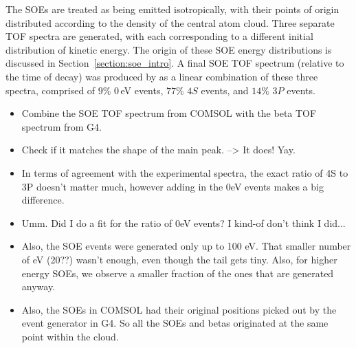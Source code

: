 The SOEs are treated as being emitted isotropically, with their points of origin distributed according to the density of the central atom cloud.  Three separate TOF spectra are generated, with each corresponding to a different initial distribution of kinetic energy.  The origin of these SOE energy distributions is discussed in Section~\ref{section:soe_intro}.  A final SOE TOF spectrum (relative to the time of decay) was produced by as a linear combination of these three spectra, comprised of $9\%$ 0\,eV events, $77\%$ $4S$ events, and $14\%$ $3P$ events.

\begin{itemize}
	\item Combine the SOE TOF spectrum from COMSOL with the beta TOF spectrum from G4.  
	\item Check if it matches the shape of the main peak. --> It does!  Yay.  
	\item In terms of agreement with the experimental spectra, the exact ratio of 4S to 3P doesn't matter much, however adding in the 0eV events makes a big difference.   
	\item Umm.  Did I do a fit for the ratio of 0eV events?  I kind-of don't think I did... 
	\item Also, the SOE events were generated only up to 100 eV.  That smaller number of eV (20??) wasn't enough, even though the tail gets tiny.  Also, for higher energy SOEs, we observe a smaller fraction of the ones that are generated anyway.  
	\item Also, the SOEs in COMSOL had their original positions picked out by the event generator in G4.  So all the SOEs and betas originated at the same point within the cloud.
\end{itemize}

